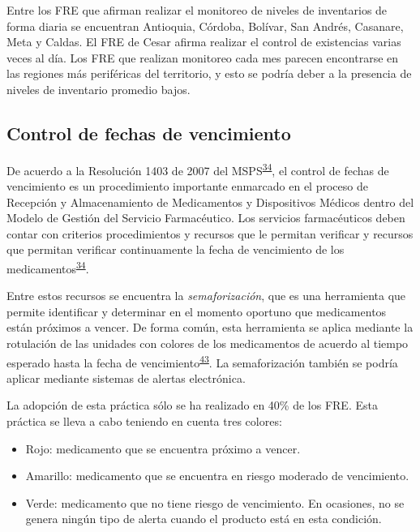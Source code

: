 \documentclass[
]{book}
\begin{document}
Entre los FRE que afirman realizar el monitoreo de niveles de inventarios de forma diaria se encuentran Antioquia, Córdoba, Bolívar, San Andrés, Casanare, Meta y Caldas. El FRE de Cesar afirma realizar el control de existencias varias veces al día. Los FRE que realizan monitoreo cada mes parecen encontrarse en las regiones más periféricas del territorio, y esto se podría deber a la presencia de niveles de inventario promedio bajos.

\hypertarget{control-de-fechas-de-vencimiento}{%
\subsection{Control de fechas de vencimiento}\label{control-de-fechas-de-vencimiento}}

De acuerdo a la Resolución 1403 de 2007 del MSPS\textsuperscript{\protect\hyperlink{ref-MinisteriodeSaludyProteccionSocial2007}{34}}, el control de fechas de vencimiento es un procedimiento importante enmarcado en el proceso de Recepción y Almacenamiento de Medicamentos y Dispositivos Médicos dentro del Modelo de Gestión del Servicio Farmacéutico. Los servicios farmacéuticos deben contar con criterios procedimientos y recursos que le permitan verificar y recursos que permitan verificar continuamente la fecha de vencimiento de los medicamentos\textsuperscript{\protect\hyperlink{ref-MinisteriodeSaludyProteccionSocial2007}{34}}.

Entre estos recursos se encuentra la \emph{semaforización}, que es una herramienta que permite identificar y determinar en el momento oportuno que medicamentos están próximos a vencer. De forma común, esta herramienta se aplica mediante la rotulación de las unidades con colores de los medicamentos de acuerdo al tiempo esperado hasta la fecha de vencimiento\textsuperscript{\protect\hyperlink{ref-HernandezVera2017}{43}}. La semaforización también se podría aplicar mediante sistemas de alertas electrónica.

La adopción de esta práctica sólo se ha realizado en 40\% de los FRE. Esta práctica se lleva a cabo teniendo en cuenta tres colores:

\begin{itemize}
\item
  Rojo: medicamento que se encuentra próximo a vencer.
\item
  Amarillo: medicamento que se encuentra en riesgo moderado de vencimiento.
\item
  Verde: medicamento que no tiene riesgo de vencimiento. En ocasiones, no se genera ningún tipo de alerta cuando el producto está en esta condición.
\end{itemize}
\end{document}
